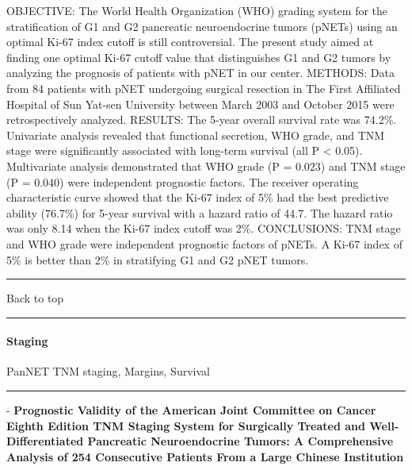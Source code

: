 \documentclass[]{article}
\let\oldparagraph\paragraph
\renewcommand{\paragraph}[1]{\oldparagraph{#1}\mbox{}}
\begin{document}
OBJECTIVE: The World Health Organization (WHO) grading system for the
stratification of G1 and G2 pancreatic neuroendocrine tumors (pNETs)
using an optimal Ki-67 index cutoff is still controversial. The present
study aimed at finding one optimal Ki-67 cutoff value that distinguishes
G1 and G2 tumors by analyzing the prognosis of patients with pNET in our
center. METHODS: Data from 84 patients with pNET undergoing surgical
resection in The First Affiliated Hospital of Sun Yat-sen University
between March 2003 and October 2015 were retrospectively analyzed.
RESULTS: The 5-year overall survival rate was 74.2\%. Univariate
analysis revealed that functional secretion, WHO grade, and TNM stage
were significantly associated with long-term survival (all P \textless{}
0.05). Multivariate analysis demonstrated that WHO grade (P = 0.023) and
TNM stage (P = 0.040) were independent prognostic factors. The receiver
operating characteristic curve showed that the Ki-67 index of 5\% had
the best predictive ability (76.7\%) for 5-year survival with a hazard
ratio of 44.7. The hazard ratio was only 8.14 when the Ki-67 index
cutoff was 2\%. CONCLUSIONS: TNM stage and WHO grade were independent
prognostic factors of pNETs. A Ki-67 index of 5\% is better than 2\% in
stratifying G1 and G2 pNET tumors.

{}

{}

\begin{center}\rule{0.5\linewidth}{\linethickness}\end{center}

Back to top

\begin{center}\rule{0.5\linewidth}{\linethickness}\end{center}

\pagebreak

\hypertarget{staging-1}{%
\paragraph{Staging}\label{staging-1}}

PanNET TNM staging, Margins, Survival

\begin{center}\rule{0.5\linewidth}{\linethickness}\end{center}

 - \textbf{Prognostic Validity of the American Joint Committee on Cancer
Eighth Edition TNM Staging System for Surgically Treated and
Well-Differentiated Pancreatic Neuroendocrine Tumors: A Comprehensive
Analysis of 254 Consecutive Patients From a Large Chinese Institution}
\end{document}
